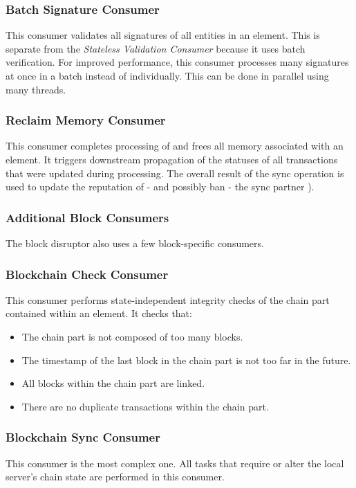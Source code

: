 \subsubsection*{Batch Signature Consumer}
This consumer validates all signatures of all entities in an element.
This is separate from the \textit{Stateless Validation Consumer} because it uses batch verification.
For improved performance, this consumer processes many signatures at once in a batch instead of individually.
This can be done in parallel using many threads.

\subsubsection*{Reclaim Memory Consumer}
This consumer completes processing of and frees all memory associated with an element.
It triggers downstream propagation of the statuses of all transactions that were updated during processing.
The overall result of the sync operation is used to update the reputation of - and possibly ban - the sync partner ).

\subsubsection{Additional Block Consumers}
\label{sec:disruptor:blockConsumers}
The block disruptor also uses a few block-specific consumers.

\subsubsection*{Blockchain Check Consumer}
This consumer performs state-independent integrity checks of the chain part contained within an element.
It checks that:
\begin{itemize}
	\item The chain part is not composed of too many blocks.
	\item The timestamp of the last block in the chain part is not too far in the future.
	\item All blocks within the chain part are linked.
	\item There are no duplicate transactions within the chain part.
\end{itemize}

\subsubsection*{Blockchain Sync Consumer}
This consumer is the most complex one.
All tasks that require or alter the local server's chain state are performed in this consumer.


